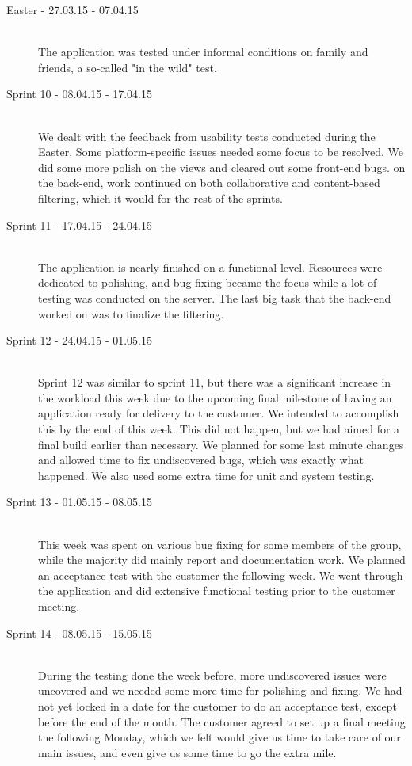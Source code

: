 \begin{description}
	\item[Easter - 27.03.15 - 07.04.15] \hfill \\ 
	The application was tested under informal conditions on family and friends, a so-called "in the wild" test.
	
	\item[Sprint 10 - 08.04.15 - 17.04.15] \hfill \\ 
	We dealt with the feedback from usability tests conducted during the Easter. Some platform-specific issues needed some focus to be resolved. We did some more polish on the views and cleared out some front-end bugs. on the back-end, work continued on both collaborative and content-based filtering, which it would for the rest of the sprints. 
	
	\item[Sprint 11 - 17.04.15 - 24.04.15] \hfill \\ 
	The application is nearly finished on a functional level. Resources were dedicated to polishing, and bug fixing became the focus while a lot of testing was conducted on the server. The last big task that the back-end worked on was to finalize the filtering.
	
	\item[Sprint 12 - 24.04.15 - 01.05.15] \hfill \\ 
	Sprint 12 was similar to sprint 11, but there was a significant increase in the workload this week due to the upcoming final milestone of having an application ready for delivery to the customer. We intended to accomplish this by the end of this week. This did not happen, but we had aimed for a final build earlier than necessary. We planned for some last minute changes and allowed time to fix undiscovered bugs, which was exactly what happened. We also used some extra time for unit and system testing.
	
	\item[Sprint 13 - 01.05.15 - 08.05.15] \hfill \\ 
	This week was spent on various bug fixing for some members of the group, while the majority did mainly report and documentation work. We planned an acceptance test with the customer the following week. We went through the application and did extensive functional testing prior to the customer meeting.
	
	\item[Sprint 14 - 08.05.15 - 15.05.15] \hfill \\ 
	During the testing done the week before, more undiscovered issues were uncovered and we needed some more time for polishing and fixing. We had not yet locked in a date for the customer to do an acceptance test, except before the end of the month. The customer agreed to set up a final meeting the following Monday, which we felt would give us time to take care of our main issues, and even give us some time to go the extra mile.
	

\end{description}
